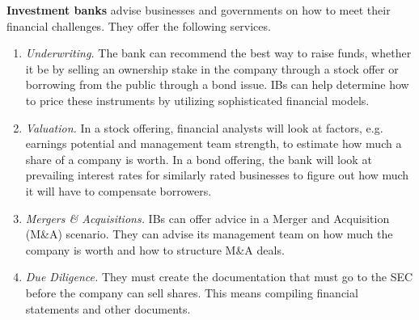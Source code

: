 \documentclass{article}
\begin{document}
    \begin{definition}
      \textbf{Investment banks} advise businesses and governments on how to meet their financial challenges. They offer the following services. 
      \begin{enumerate}
        \item \textit{Underwriting. }The bank can recommend the best way to raise funds, whether it be by selling an ownership stake in the company through a stock offer or borrowing from the public through a bond issue. IBs can help determine how to price these instruments by utilizing sophisticated financial models. 
        \item \textit{Valuation. }In a stock offering, financial analysts will look at factors, e.g. earnings potential and management team strength, to estimate how much a share of a company is worth. In a bond offering, the bank will look at prevailing interest rates for similarly rated businesses to figure out how much it will have to compensate borrowers. 
        \item \textit{Mergers \& Acquisitions. }IBs can offer advice in a Merger and Acquisition (M\&A) scenario. They can advise its management team on how much the company is worth and how to structure M\&A deals. 
        \item \textit{Due Diligence. }They must create the documentation that must go to the SEC before the company can sell shares. This means compiling financial statements and other documents. 
      \end{enumerate}
    \end{definition}
\end{document}
